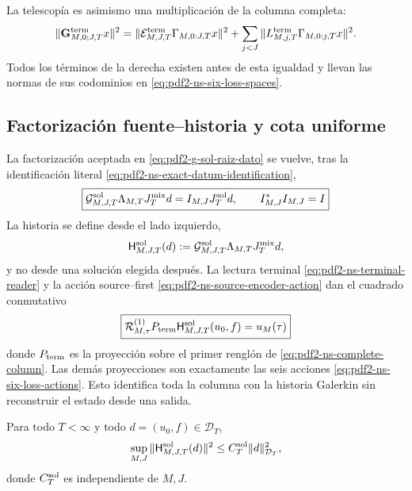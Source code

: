 La telescopía es asimismo una multiplicación de la columna completa:
\begin{equation}\label{eq:pdf2-ns-global-column-isometry}
 \|\mathbf G_{M,0;J,T}^{\rm term}x\|^2
 =\|\mathcal E_{M,J,T}^{\rm term}\Gamma_{M,0:J,T}x\|^2
 +\sum_{j<J}\|L_{M,j,T}^{\rm term}
                  \Gamma_{M,0:j,T}x\|^2.
\end{equation}
Todos los términos de la derecha existen antes de esta igualdad y llevan las
normas de sus codominios en \eqref{eq:pdf2-ns-six-loss-spaces}.

\subsection{Factorización fuente--historia y cota uniforme}

La factorización aceptada en
\eqref{eq:pdf2-g-sol-raiz-dato} se vuelve, tras la identificación literal
\eqref{eq:pdf2-ns-exact-datum-identification},
\begin{equation}\label{eq:pdf2-ns-source-colligation}
 \boxed{\begin{gathered}
 \mathcal G_{M,J,T}^{\rm sol}\Lambda_{M,T}J_T^{\rm mix}d
 =I_{M,J}J_T^{\rm sol}d,
 \qquad I_{M,J}^*I_{M,J}=I
 \end{gathered}}
\end{equation}
La historia se define desde el lado izquierdo,
\begin{equation}\label{eq:pdf2-ns-root-factorization}
 \mathsf H_{M,J,T}^{\rm sol}(d):=
 \mathcal G_{M,J,T}^{\rm sol}\Lambda_{M,T}J_T^{\rm mix}d,
\end{equation}
y no desde una solución elegida después. La lectura terminal
\eqref{eq:pdf2-ns-terminal-reader} y la acción source--first
\eqref{eq:pdf2-ns-source-encoder-action} dan el cuadrado conmutativo
\begin{equation}\label{eq:pdf2-ns-data-history-commutation}
 \boxed{\begin{gathered}
 \mathcal R_{M,\tau}^{(1)}P_{\rm term}
 \mathsf H_{M,J,T}^{\rm sol}(u_0,f)=u_M(\tau)
 \end{gathered}}
\end{equation}
donde $P_{\rm term}$ es la proyección sobre el primer renglón de
\eqref{eq:pdf2-ns-complete-column}. Las demás proyecciones son exactamente las
seis acciones \eqref{eq:pdf2-ns-six-loss-actions}. Esto identifica toda la
columna con la historia Galerkin sin reconstruir el estado desde una salida.

\begin{theorem}
\label{thm:pdf2-ns-root-uniform}
Para todo $T<\infty$ y todo $d=(u_0,f)\in\mathcal D_T$,
\begin{equation}\label{eq:pdf2-ns-root-bound}
 \sup_{M,J}\|\mathsf H_{M,J,T}^{\rm sol}(d)\|^2
 \le C_T^{\rm sol}\|d\|_{\mathcal D_T}^2,
\end{equation}
donde $C_T^{\rm sol}$ es independiente de $M,J$.
\end{theorem}

